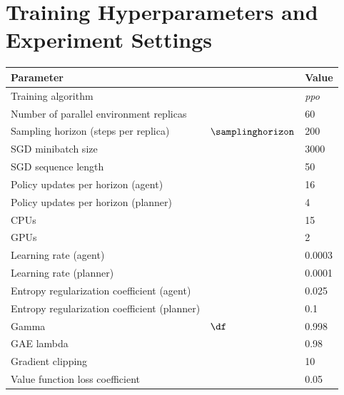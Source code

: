 \section{Training Hyperparameters and Experiment Settings}
\label{sec:hyperparameters}

\begin{table}[ht!]
    \begin{small}
        \begin{center}
            \begin{tabular}[c]{lll}
                Parameter & & Value \\
                \hline
                \hline

                Training algorithm & & \textit{ppo} \\
                Number of parallel environment replicas & & 60 \\
                Sampling horizon (steps per replica) & $\samplinghorizon$ & 200 \\
                SGD minibatch size & & 3000 \\
                SGD sequence length & & 50 \\
                Policy updates per horizon (agent) & & 16 \\
                Policy updates per horizon (planner) & & 4 \\

                CPUs & & 15 \\
                GPUs & & 2 \\


                \hline

                Learning rate (agent) & & 0.0003 \\
                Learning rate (planner) & & 0.0001 \\
                Entropy regularization coefficient (agent) & & 0.025 \\
                Entropy regularization coefficient (planner) & & 0.1 \\
                Gamma & $\df$ & 0.998 \\
                GAE lambda & & 0.98 \\
                Gradient clipping & & 10 \\
                Value function loss coefficient & & 0.05 \\

                \hline


\end{tabular}
\end{center}
\end{small}
\end{table}
